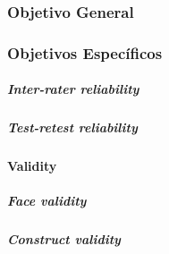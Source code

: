 \subsubsection{Objetivo General}

\lipsum[8]

\subsubsection{Objetivos Específicos}

\lipsum[9]

\subparagraph{Inter-rater reliability}
\lipsum[10]

\subparagraph{Test-retest reliability}
\lipsum[11]

\paragraph{Validity}
\lipsum[12]

\subparagraph{Face validity}
\lipsum[13]

\subparagraph{Construct validity}
\lipsum[14]